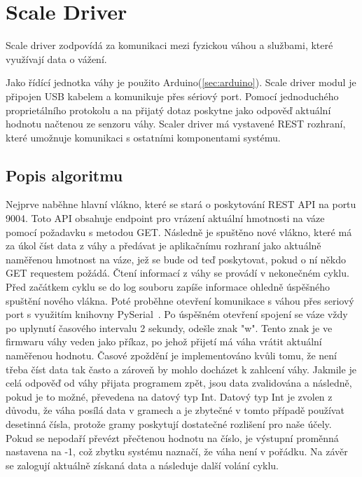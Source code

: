 \section{Scale Driver}\label{sec:scale-driver}
Scale driver zodpovídá za komunikaci mezi fyzickou váhou a službami, které využívají data o vážení.\newline

Jako řídící jednotka váhy je použito Arduino(\ref{sec:arduino}).
Scale driver modul je připojen USB kabelem a komunikuje přes sériový port.
Pomocí jednoduchého proprietálního protokolu a na přijatý dotaz poskytne jako odpověď aktuální hodnotu načtenou ze senzoru váhy.
Scaler driver má vystavené REST rozhraní, které umožnuje komunikaci s ostatními komponentami systému.

\subsection*{Popis algoritmu}
Nejprve naběhne hlavní vlákno, které se stará o poskytování REST API na portu 9004.
Toto API obsahuje endpoint pro vrázení aktuální hmotnosti na váze pomocí požadavku s metodou GET.
Následně je spuštěno nové vlákno, které má za úkol číst data z váhy a předávat je aplikačnímu rozhraní jako aktuálně naměřenou hmotnost na váze, jež se bude od teď poskytovat, pokud o ní někdo GET requestem požádá.
Čtení informací z váhy se provádí v nekonečném cyklu.
Před začátkem cyklu se do log souboru zapíše informace ohledně úspěšného spuštění nového vlákna.
Poté proběhne otevření komunikace s váhou přes seriový port s využitím knihovny PySerial~\cite{PySerial}.
Po úspěšném otevření spojení se váze vždy po uplynutí časového intervalu 2 sekundy, odešle znak "w".
Tento znak je ve firmwaru váhy veden jako příkaz, po jehož přijetí má váha vrátit aktuální naměřenou hodnotu.
Časové zpoždění je implementováno kvůli tomu, že není třeba číst data tak často a zároveň by mohlo docházet k zahlcení váhy.
Jakmile je celá odpověď od váhy přijata programem zpět, jsou data zvalidována a následně, pokud je to možné, převedena na datový typ Int.
Datový typ Int je zvolen z důvodu, že váha posílá data v gramech a je zbytečné v tomto případě používat desetinná čísla, protože gramy poskytují dostatečné rozlišení pro naše účely.
Pokud se nepodaří převézt přečtenou hodnotu na číslo, je výstupní proměnná nastavena na -1, což zbytku systému naznačí, že váha není v pořádku.
Na závěr se zalogují aktuálně získaná data a následuje další volání cyklu.



